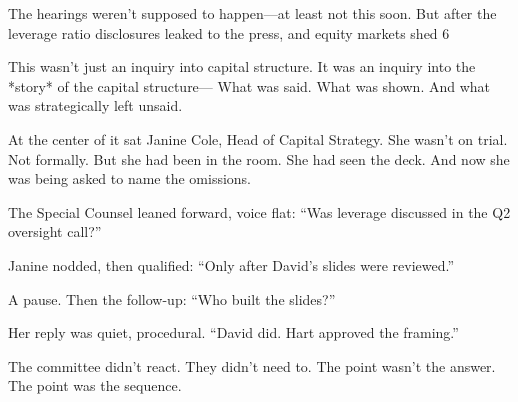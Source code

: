 \medskip

The hearings weren’t supposed to happen—at least not this soon.
But after the leverage ratio disclosures leaked to the press, and equity markets shed 6%

This wasn’t just an inquiry into capital structure.
It was an inquiry into the *story* of the capital structure—
What was said. What was shown. And what was strategically left unsaid.

At the center of it sat Janine Cole, Head of Capital Strategy.
She wasn’t on trial. Not formally.
But she had been in the room.
She had seen the deck.
And now she was being asked to name the omissions.

The Special Counsel leaned forward, voice flat:
“Was leverage discussed in the Q2 oversight call?”

Janine nodded, then qualified:
“Only after David’s slides were reviewed.”

A pause. Then the follow-up:
“Who built the slides?”

Her reply was quiet, procedural.
“David did. Hart approved the framing.”

The committee didn’t react. They didn’t need to.
The point wasn’t the answer.
The point was the sequence.



\medskip

